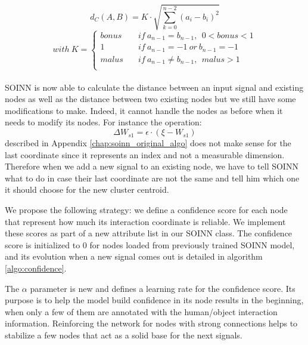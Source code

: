 \begin{equation}
    d_C(A, B) = K\cdot \sqrt{\sum_{k=0}^{n-2}(a_i-b_i)^2} 
\end{equation}
\[
with~K =
\begin{cases}
    bonus &\quad if~a_{n-1}=b_{n-1},~~ 0 < bonus < 1 \\
    1 &\quad if~a_{n-1}=-1~or~b_{n-1}=-1 \\
    malus &\quad if~a_{n-1}\neq b_{n-1},~~ malus > 1 \\
\end{cases} 
\]
\\
SOINN is now able to calculate the distance between an input signal and existing nodes as well as the distance between two existing nodes but we still have some modifications to make. Indeed, it cannot handle the nodes as before when it needs to modify its nodes. For instance the operation:
\begin{equation}
    \Delta W_{s1} = \epsilon \cdot (\xi - W_{s1})
\end{equation}
described in Appendix \ref{chap:soinn_original_algo} does not make sense for the last coordinate since it represents an index and not a measurable dimension. Therefore when we add a new signal to an existing node, we have to tell SOINN what to do in case their last coordinate are not the same and tell him which one it should choose for the new cluster centroid. 

We propose the following strategy: we define a confidence score for each node that represent how much its interaction coordinate is reliable. We implement these scores as part of a new attribute list in our SOINN class. The confidence score is initialized to 0 for nodes loaded from previously trained SOINN model, and its evolution when a new signal comes out is detailed in algorithm \ref{algo:confidence}. 

The $\alpha$ parameter is new and defines a learning rate for the confidence score. Its purpose is to help the model build confidence in its node results in the beginning, when only a few of them are annotated with the human/object interaction information. Reinforcing the network for nodes with strong connections helps to stabilize a few nodes that act as a solid base for the next signals.

